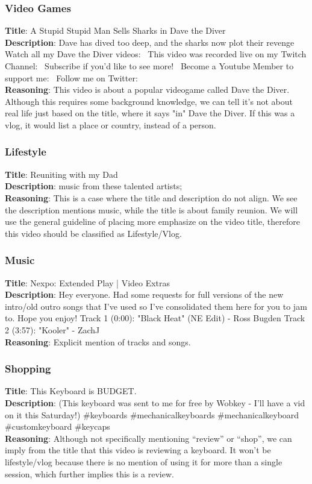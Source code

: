 \documentclass[11pt]{article}
\begin{document}
\subsubsection{Video Games}
\textbf{Title}: A Stupid Stupid Man Sells Sharks in Dave the Diver \\
\textbf{Description}: Dave has dived too deep, and the sharks now plot their revenge
    Watch all my Dave the Diver videos:
    ~This video was recorded live on my Twitch Channel:
    ~Subscribe if you'd like to see more! 
    ~Become a Youtube Member to support me:
    ~Follow me on Twitter: \\
\textbf{Reasoning}: This video is about a popular videogame called Dave the Diver. Although this requires some background knowledge, we can tell it's not about real life just based on the title, where it says "in" Dave the Diver. If this was a vlog, it would list a place or country, instead of a person. 

\subsubsection{Lifestyle}
\textbf{Title}: Reuniting with my Dad \\
\textbf{Description}: music from these talented artists; \\
\textbf{Reasoning}: This is a case where the title and description do not align. We see the description mentions music, while the title is about family reunion. We will use the general guideline of placing more emphasize on the video title, therefore this video should be classified as Lifestyle/Vlog.

\subsubsection{Music}
\textbf{Title}: Nexpo: Extended Play | Video Extras \\
\textbf{Description}: Hey everyone. Had some requests for full versions of the new intro/old outro songs that I've used so I've consolidated them here for you to jam to. 
  Hope you enjoy!
  Track 1 (0:00): 
  "Black Heat" (NE Edit) - Ross Bugden
  Track 2 (3:57):
  "Kooler" - ZachJ \\
\textbf{Reasoning}: Explicit mention of tracks and songs. 

\subsubsection{Shopping}
\textbf{Title}: This Keyboard is BUDGET. \\
\textbf{Description}: (This keyboard was sent to me for free by Wobkey - I'll have a vid on it this Saturday!) \#keyboards \#mechanicalkeyboards \#mechanicalkeyboard \#customkeyboard \#keycaps \\
\textbf{Reasoning}: Although not specifically mentioning “review” or “shop”, we can imply from the title that this video is reviewing a keyboard. It won’t be lifestyle/vlog because there is no mention of using it for more than a single session, which further implies this is a review.
\end{document}
